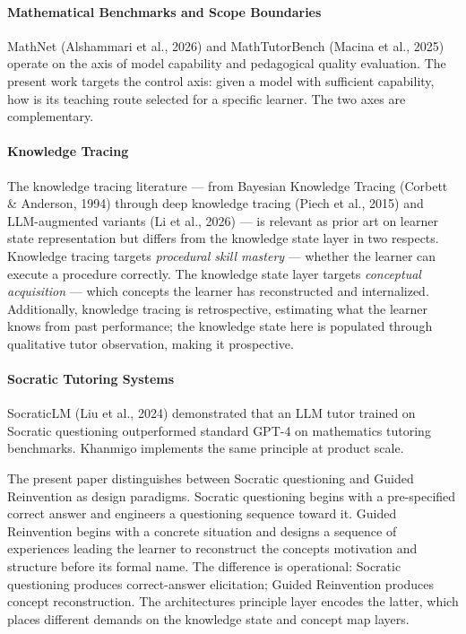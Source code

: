 \documentclass[
]{article}
\begin{document}
\paragraph{Mathematical Benchmarks and Scope Boundaries}\label{mathematical-benchmarks-and-scope-boundaries}

MathNet (Alshammari et al., 2026) and MathTutorBench (Macina et al., 2025) operate on the axis of model capability and pedagogical quality evaluation. The present work targets the control axis: given a model with sufficient capability, how is its teaching route selected for a specific learner. The two axes are complementary.

\paragraph{Knowledge Tracing}\label{knowledge-tracing}

The knowledge tracing literature --- from Bayesian Knowledge Tracing (Corbett \& Anderson, 1994) through deep knowledge tracing (Piech et al., 2015) and LLM-augmented variants (Li et al., 2026) --- is relevant as prior art on learner state representation but differs from the knowledge state layer in two respects. Knowledge tracing targets \emph{procedural skill mastery} --- whether the learner can execute a procedure correctly. The knowledge state layer targets \emph{conceptual acquisition} --- which concepts the learner has reconstructed and internalized. Additionally, knowledge tracing is retrospective, estimating what the learner knows from past performance; the knowledge state here is populated through qualitative tutor observation, making it prospective.

\paragraph{Socratic Tutoring Systems}\label{socratic-tutoring-systems}

SocraticLM (Liu et al., 2024) demonstrated that an LLM tutor trained on Socratic questioning outperformed standard GPT-4 on mathematics tutoring benchmarks. Khanmigo implements the same principle at product scale.

The present paper distinguishes between Socratic questioning and Guided Reinvention as design paradigms. Socratic questioning begins with a pre-specified correct answer and engineers a questioning sequence toward it. Guided Reinvention begins with a concrete situation and designs a sequence of experiences leading the learner to reconstruct the concept\textquotesingle s motivation and structure before its formal name. The difference is operational: Socratic questioning produces correct-answer elicitation; Guided Reinvention produces concept reconstruction. The architecture\textquotesingle s principle layer encodes the latter, which places different demands on the knowledge state and concept map layers.
\end{document}
